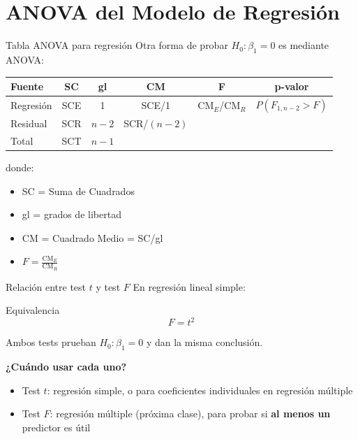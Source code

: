 \documentclass[aspectratio=169]{beamer}
\begin{document}
\section{ANOVA del Modelo de Regresión}

\begin{frame}{Tabla ANOVA para regresión}
Otra forma de probar $H_0: \beta_1 = 0$ es mediante ANOVA:

\begin{table}
\centering
\begin{tabular}{lccccc}
\toprule
\textbf{Fuente} & \textbf{SC} & \textbf{gl} & \textbf{CM} & \textbf{F} & \textbf{p-valor} \\
\midrule
Regresión & SCE & 1 & SCE/1 & CM$_E$/CM$_R$ & $P(F_{1,n-2} > F)$ \\
Residual & SCR & $n-2$ & SCR/$(n-2)$ & & \\
\midrule
Total & SCT & $n-1$ & & & \\
\bottomrule
\end{tabular}
\end{table}

\vspace{0.3cm}
donde:
\begin{itemize}
    \item SC = Suma de Cuadrados
    \item gl = grados de libertad
    \item CM = Cuadrado Medio = SC/gl
    \item $F = \frac{\text{CM}_E}{\text{CM}_R}$
\end{itemize}
\end{frame}

\begin{frame}{Relación entre test $t$ y test $F$}
En regresión lineal simple:

\begin{alertblock}{Equivalencia}
\[
F = t^2
\]
\end{alertblock}

\vspace{0.3cm}
Ambos tests prueban $H_0: \beta_1 = 0$ y dan la misma conclusión.

\vspace{0.5cm}
\textbf{¿Cuándo usar cada uno?}
\begin{itemize}
    \item Test $t$: regresión simple, o para coeficientes individuales en regresión múltiple
    \item Test $F$: regresión múltiple (próxima clase), para probar si \textbf{al menos un} predictor es útil
\end{itemize}
\end{frame}
\end{document}
